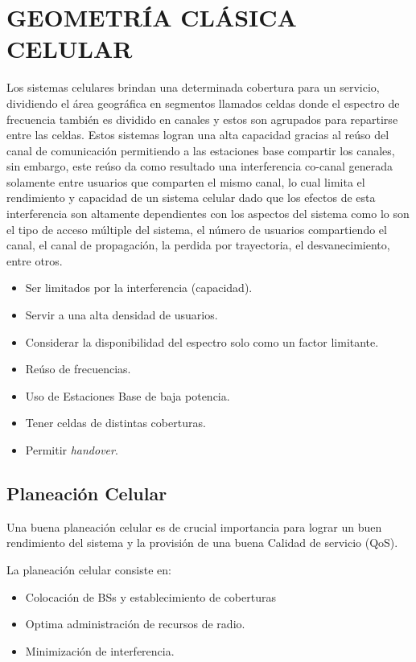 \section{GEOMETRÍA CLÁSICA CELULAR}

Los sistemas celulares brindan una determinada cobertura para un servicio, dividiendo el área geográfica en segmentos llamados celdas donde el espectro de frecuencia también es dividido en canales y estos son agrupados para repartirse entre las celdas. Estos sistemas logran una alta capacidad gracias al reúso del canal de comunicación permitiendo a las estaciones base compartir los canales, sin embargo, este reúso da como resultado una interferencia co-canal generada solamente entre usuarios que comparten el mismo canal, lo cual limita el rendimiento y capacidad de un sistema celular dado que los efectos de esta interferencia son altamente dependientes con los aspectos del sistema \parencite{Tranter2003} como lo son el tipo de acceso múltiple del sistema, el número de usuarios compartiendo el canal, el canal de propagación, la perdida por trayectoria, el desvanecimiento, entre otros.\newline

\begin{itemize}
    \item Ser limitados por la interferencia (capacidad).
    \item Servir a una alta densidad de usuarios.
    \item Considerar la disponibilidad del espectro solo como un factor limitante.
    \item Reúso de frecuencias.
    \item Uso de Estaciones Base de baja potencia.
    \item Tener celdas de distintas coberturas.
    \item Permitir \textit{handover}.
\end{itemize}

\subsection{Planeación Celular}

Una buena planeación celular es de crucial importancia para lograr un buen rendimiento del sistema y la provisión de una buena Calidad de servicio (QoS).\newline

La planeación celular consiste en:\newline
\begin{itemize}
    \item Colocación de BSs y establecimiento de coberturas
    \item Optima administración de recursos de radio.
    \item Minimización de interferencia.
\end{itemize}

